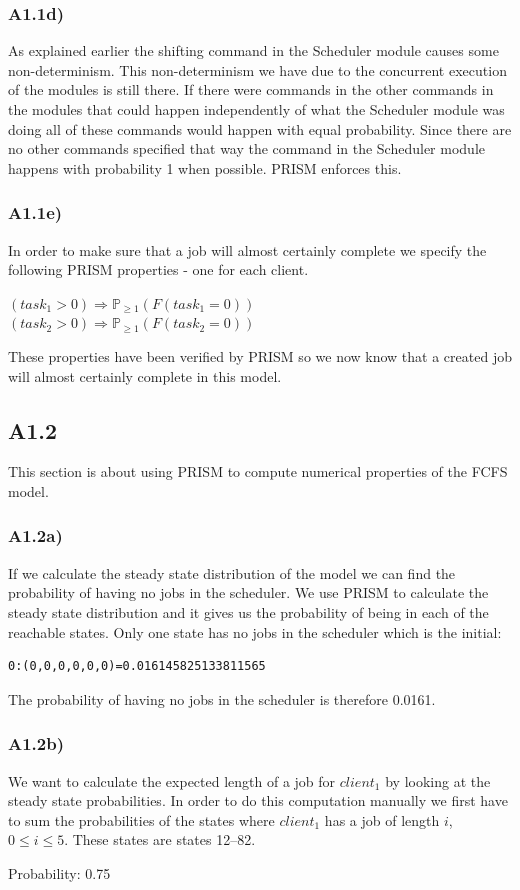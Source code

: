 \documentclass[12pt]{report}
\begin{document}
\subsubsection*{A1.1d)}
As explained earlier the shifting command in the Scheduler module causes some non-determinism. This non-determinism we have due to the concurrent execution of the modules is still there. If there were commands in the other commands in the modules that could happen independently of what the Scheduler module was doing all of these commands would happen with equal probability. Since there are no other commands specified that way the command in the Scheduler module happens with probability 1 when possible. PRISM enforces this.

\subsubsection*{A1.1e)}
In order to make sure that a job will almost certainly complete we specify the following PRISM properties - one for each client.
\begin{center}
$(task_1 > 0) \Rightarrow \mathbb{P}_{\geq 1}(F(task_1 = 0))$\\
$(task_2 > 0) \Rightarrow \mathbb{P}_{\geq 1}(F(task_2 = 0))$
\end{center}
These properties have been verified by PRISM so we now know that a created job will almost certainly complete in this model.

\subsection*{A1.2}
This section is about using PRISM to compute numerical properties of the FCFS model.

\subsubsection*{A1.2a)}
If we calculate the steady state distribution of the model we can find the probability of having no jobs in the scheduler. We use PRISM to calculate the steady state distribution and it gives us the probability of being in each of the reachable states. Only one state has no jobs in the scheduler which is the initial:
\begin{lstlisting}[style=logoutput]
0:(0,0,0,0,0,0)=0.016145825133811565
\end{lstlisting}
The probability of having no jobs in the scheduler is therefore 0.0161.

\subsubsection*{A1.2b)}
We want to calculate the expected length of a job for $client_1$ by looking at the steady state probabilities. In order to do this computation manually we first have to sum the probabilities of the states where $client_1$ has a job of length $i$, $0 \leq i \leq 5$. These states are states 12--82.
\begin{center}
Probability: 0.75
\end{center}
\end{document}
